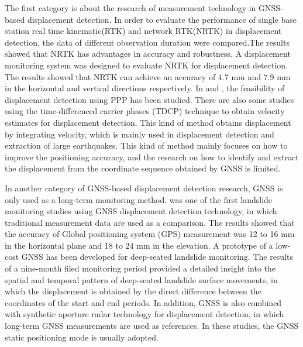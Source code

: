 \documentclass{svjour3}                     %
\begin{document}
The first category is about the research of measurement technology in GNSS-based displacement detection.
In order to evaluate the performance of single base station real time kinematic(RTK) and network RTK(NRTK) in displacement detection, the data of different observation duration were compared\citep{wang2011gps}.The results showed that NRTK has advantages in accuracy and robustness.
A displacement monitoring system was designed to evaluate NRTK for displacement detection\citep{GUMUS2019131}. The results showed that NRTK can achieve an accuracy of 4.7 mm and 7.9 mm in the horizontal and vertical directions respectively.
In \cite{csanliouglu2016landslide} and \cite{lytvyn2012real}, the feasibility of displacement detection using PPP has been studied. There are also some studies using the time-differenced carrier phases (TDCP) technique\citep{freda2015time,colosimo2011real} to obtain velocity estimates for displacement detection. This kind of method obtains displacement by integrating velocity, which is mainly used in displacement detection and extraction of large earthquakes.
This kind of method mainly focuses on how to improve the positioning accuracy, and the research on how to identify and extract the displacement from the coordinate sequence obtained by GNSS is limited.

In another category of GNSS-based displacement detection research, GNSS is only used as a long-term monitoring method.
\cite{gili2000using} was one of the first landslide monitoring studies using GNSS displacement detection technology, in which traditional measurement data are used as a comparison. The results showed that the accuracy of Global positioning system (GPS) measurement was 12 to 16 mm in the horizontal plane and 18 to 24 mm in the elevation.
A prototype of a low-cost GNSS has been developed for deep-seated landslide monitoring\citep{rs12203375}. The results of a nine-month filed monitoring period provided a detailed insight into the spatial and temporal pattern of deep-seated landslide surface movements, in which the displacement is obtained by the direct difference between the coordinates of the start and end periods.
In addition, GNSS is also combined with synthetic aperture radar technology for displacement detection, in which long-term GNSS measurements are used as references\citep{atanasova2018ground,fuhrmann2015estimation}.
In these studies, the GNSS static positioning mode is usually adopted.
\end{document}
